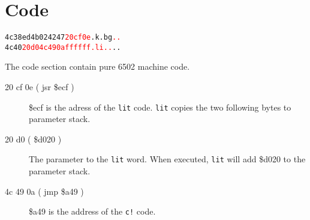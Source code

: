 \section{Code}

\begin{alltt}
4c38  ed 4b 02 42 47 \textcolor{red}{20 cf 0e} .k.bg\textcolor{red}{ ..}
4c40  \textcolor{red}{20 d0 4c 49 0a ff ff ff  .li..}..
\end{alltt}

The code section contain pure 6502 machine code.

\begin{description}
\item[20 cf 0e ( jsr \$ecf )] \$ecf is the adress of the \texttt{lit} code. \texttt{lit} copies the two following bytes to parameter stack.
\item[20 d0 ( \$d020 )] The parameter to the \texttt{lit} word. When executed, \texttt{lit} will add \$d020 to the parameter stack.
\item[4c 49 0a ( jmp \$a49 )] \$a49 is the address of the \texttt{c!} code.
\end{description}
